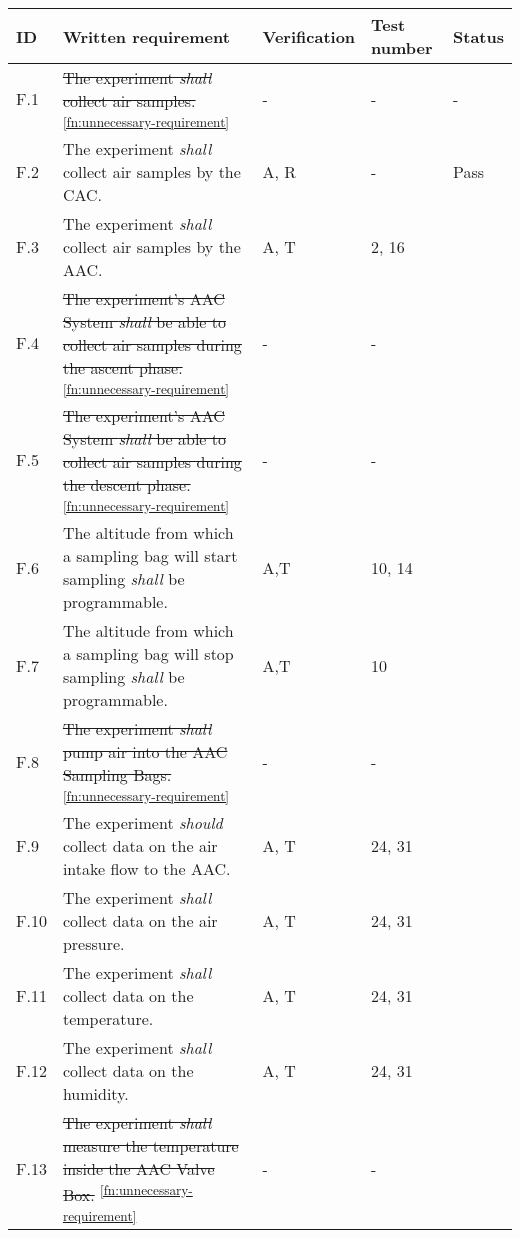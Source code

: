 \makeatletter
\renewcommand\@makefntext[1]{\leftskip=3em\hskip-1em\@makefnmark#1}
\makeatother

\begin{longtable}[]{|m{}| m{} |m{} |m{}|m{}|}

\hline
ID   & Written requirement                                                                                                                                                     & Verification & Test number & Status \\ \hline
F.1  & \st{The experiment \textit{shall} collect air samples.}\textsuperscript{\ref{fn:unnecessary-requirement}}     &- &- &- \\ \hline
F.2  & The experiment \textit{shall} collect air samples by the CAC.&  A, R & - & Pass \\ \hline
F.3  & The experiment \textit{shall} collect air samples by the AAC. & A, T& 2, 16 & \\ \hline
F.4  & \st{The experiment's AAC System \textit{shall} be able to collect air samples during the ascent phase.}\textsuperscript{\ref{fn:unnecessary-requirement}} & - & -& \\ \hline
F.5  & \st{The experiment's AAC System \textit{shall} be able to collect air samples during the descent phase.}\textsuperscript{\ref{fn:unnecessary-requirement}} & - & - & \\ \hline
F.6  & The altitude from which a sampling bag will start sampling \textit{shall} be programmable. & A,T&  10, 14  &\\ \hline
F.7  & The altitude from which a sampling bag will stop sampling \textit{shall} be programmable.& A,T & 10  &\\ \hline
F.8  &\st{The experiment \textit{shall} pump air into the AAC Sampling Bags.}\textsuperscript{\ref{fn:unnecessary-requirement}}  & - & -&\\ \hline
F.9  & The experiment \textit{should} collect data on the air intake flow to the AAC. & A, T & 24, 31 & \\ \hline
F.10 & The experiment \textit{shall} collect data on the air pressure. & A, T& 24, 31 & \\ \hline
F.11 & The experiment \textit{shall} collect data on the temperature. &  A, T& 24, 31 & \\ \hline
F.12 & The experiment \textit{shall} collect data on the humidity. & A, T & 24, 31  & \\ \hline
F.13 & \st{The experiment \textit{shall} measure the temperature inside the AAC Valve Box.} \textsuperscript{\ref{fn:unnecessary-requirement}}&- & -& \\ \hline

\end{longtable}
